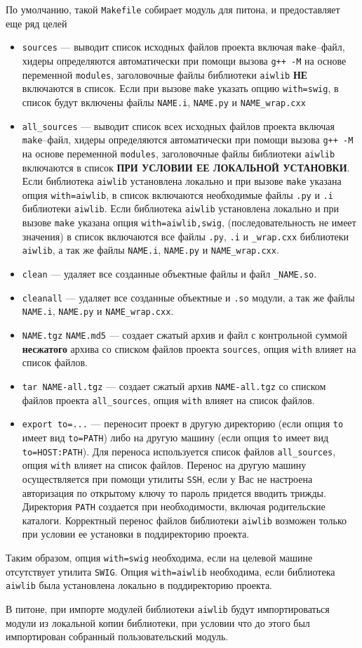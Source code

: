 По умолчанию, такой \verb'Makefile' собирает модуль для питона, и предоставляет еще ряд целей
\begin{itemize}
\item \verb'sources' --- выводит список исходных файлов проекта включая \verb'make'--файл, хидеры определяются автоматически 
при помощи вызова \verb'g++ -M' на основе переменной \verb'modules', заголовочные файлы библиотеки \verb'aiwlib' 
{\bf НЕ} включаются в список. Если при вызове \verb'make' указать опцию \verb'with=swig', в список будут включены файлы 
\verb'NAME.i', \verb'NAME.py' и \verb'NAME_wrap.cxx'
\item \verb'all_sources' --- выводит список всех исходных файлов проекта включая \verb'make'--файл, 
хидеры определяются автоматически 
при помощи вызова \verb'g++ -M' на основе переменной \verb'modules', заголовочные файлы библиотеки \verb'aiwlib' 
включаются в список {\bf ПРИ УСЛОВИИ ЕЕ ЛОКАЛЬНОЙ УСТАНОВКИ}. 
Если библиотека \verb'aiwlib' установлена локально и при вызове \verb'make' указана опция \verb'with=aiwlib', в список включаются  
необходимые файлы \verb'.py' и \verb'.i' библиотеки \verb'aiwlib'.
Если библиотека \verb'aiwlib' установлена локально и при вызове \verb'make' указана опция \verb'with=aiwlib,swig',
(последовательность не имеет значения) в список включаются
все файлы \verb'.py', \verb'.i' и \verb'_wrap.cxx' библиотеки \verb'aiwlib', а так же файлы 
\verb'NAME.i', \verb'NAME.py' и \verb'NAME_wrap.cxx'.
\item \verb'clean' --- удаляет все созданные объектные файлы и файл \verb'_NAME.so'.
\item \verb'cleanall' --- удаляет все созданные объектные и \verb'.so' модули, а так же файлы 
\verb'NAME.i', \verb'NAME.py' и \verb'NAME_wrap.cxx'.
\item \verb'NAME.tgz' \verb'NAME.md5' --- создает сжатый архив и файл с контрольной суммой {\bf несжатого} архива
со списком файлов  проекта \verb'sources', опция \verb'with' влияет на список файлов.
\item \verb'tar NAME-all.tgz' --- создает сжатый архив \verb'NAME-all.tgz'
со списком файлов  проекта \verb'all_sources', опция \verb'with' влияет на список файлов.
\item \verb'export to=...' --- переносит проект в другую директорию (если опция \verb'to' имеет вид \verb'to=PATH')
либо на другую машину (если опция \verb'to' имеет вид \verb'to=HOST:PATH'). Для переноса используется список 
файлов \verb'all_sources', опция \verb'with' влияет на список файлов. Перенос на другую машину осуществляется при помощи 
утилиты \verb'SSH', если у Вас не настроена авторизация по открытому ключу то пароль придется вводить трижды.
Директория \verb'PATH' создается при необходимости, включая родительские каталоги.
Корректный перенос файлов библиотеки \verb'aiwlib' возможен только при условии ее установки в поддиректорию проекта.
\end{itemize}
Таким образом, опция \verb'with=swig' необходима, если на целевой машине отсутствует утилита \verb'SWIG'. Опция \verb'with=aiwlib'
необходима, если библиотека \verb'aiwlib' была установлена локально в поддиректорию проекта.

В питоне, при импорте модулей библиотеки \verb'aiwlib' будут импортироваться модули из локальной копии библиотеки,
при условии что до этого был импортирован собранный пользовательский модуль. 
